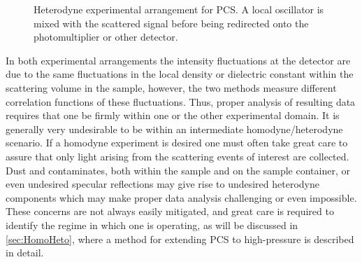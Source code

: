 \begin{figure}[!htbp]
	\centering
{}
\caption{Heterodyne experimental arrangement for PCS.  A local oscillator is mixed with the scattered signal before being redirected onto the photomultiplier or other detector.}
\label{figure:simpleHeterodyne}
\end{figure}

In both experimental arrangements the intensity fluctuations at the detector are due to the same fluctuations in the local density or dielectric constant within the scattering volume in the sample, however, the two methods measure different correlation functions of these fluctuations.  Thus, proper analysis of resulting data requires that one be firmly within one or the other experimental domain.  It is generally very undesirable to be within an intermediate homodyne/heterodyne scenario.  If a homodyne experiment is desired one must often take great care to assure that only light arising from the scattering events of interest are collected.  Dust and contaminates, both within the sample and on the sample container, or even undesired specular reflections may give rise to undesired heterodyne components which may make proper data analysis challenging or even impossible.  These concerns are not always easily mitigated, and great care is required to identify the regime in which one is operating, as will be discussed in \sect \nolinebreak \ref{sec:HomoHeto}, where a method for extending PCS to high-pressure is described in detail.


